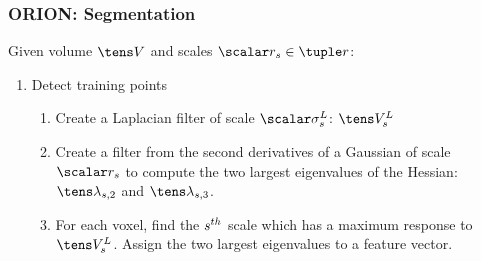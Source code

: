 \documentclass{beamer}
\begin{document}
\begin{frame}\frametitle{ORION: Segmentation}
	Given volume \(\InputVolumeName\) and scales \(\RadiiScalesElem \in \RadiiScalesName\):
	\begin{enumerate}
		\def\labelenumi{\arabic{enumi}.}
		\item Detect training points
		\begin{enumerate}
			\def\labelenumii{\arabic{enumii}.}
			\item Create a Laplacian filter of scale
				\(\LaplacianScalesElem\): \(\LaplacianOutputVolumeElem\)
			\item Create a filter from the second
				derivatives of a Gaussian of scale
				\(\RadiiScalesElem\) to compute
				the two largest eigenvalues of the Hessian:
				\(\EigSecondElem\) and
				\(\EigThirdElem\).
			\item For each voxel, find the \(s^{th}\) scale which has
				a maximum response to
				\(\LaplacianOutputVolumeElem\).
				Assign the two largest eigenvalues
				to a feature vector.
		\end{enumerate}
	\end{enumerate}
\end{frame}



\begin{frame}
	\begin{figure}
		\centering
		\resizebox{0.9\textwidth}{!}{}
	\end{figure}
\end{frame}
\end{document}
